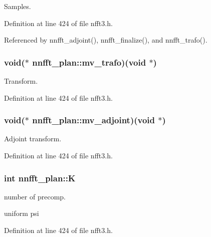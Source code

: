 Samples. 



Definition at line 424 of file nfft3.\-h.



Referenced by nnfft\-\_\-adjoint(), nnfft\-\_\-finalize(), and nnfft\-\_\-trafo().

\hypertarget{structnnfft__plan_ac2beab555e72c8f10921db21dc094069}{
\subsubsection[{mv\-\_\-trafo}]{\setlength{\rightskip}{0pt plus 5cm}void($\ast$ nnfft\-\_\-plan\-::mv\-\_\-trafo)(void $\ast$)}}\label{structnnfft__plan_ac2beab555e72c8f10921db21dc094069}


Transform. 



Definition at line 424 of file nfft3.\-h.

\hypertarget{structnnfft__plan_a0afd6961b8b0b24b526e034d89874c7c}{
\subsubsection[{mv\-\_\-adjoint}]{\setlength{\rightskip}{0pt plus 5cm}void($\ast$ nnfft\-\_\-plan\-::mv\-\_\-adjoint)(void $\ast$)}}\label{structnnfft__plan_a0afd6961b8b0b24b526e034d89874c7c}


Adjoint transform. 



Definition at line 424 of file nfft3.\-h.

\hypertarget{structnnfft__plan_a4ee39bebbff40746c2701ade2e13f1f8}{
\subsubsection[{K}]{\setlength{\rightskip}{0pt plus 5cm}int nnfft\-\_\-plan\-::\-K}}\label{structnnfft__plan_a4ee39bebbff40746c2701ade2e13f1f8}


number of precomp. 

uniform psi 

Definition at line 424 of file nfft3.\-h.



